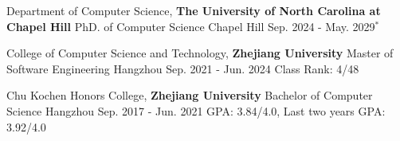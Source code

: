 \begin{cventries}

	\cventry
	{Department of Computer Science, \textbf{The University of North Carolina at Chapel Hill}} %
	{PhD. of Computer Science} %
	{Chapel Hill} %
	{Sep. 2024 - May. 2029$^*$} %
	{
	}%
	\vspace{-2mm}

	\cventry
	{College of Computer Science and Technology, \textbf{Zhejiang University}} %
	{Master of Software Engineering} %
	{Hangzhou} %
	{Sep. 2021 - Jun. 2024} %
	{
		Class Rank: 4/48
	}%

	\cventry
	{Chu Kochen Honors College, \textbf{Zhejiang University}} %
	{Bachelor of Computer Science} %
	{Hangzhou} %
	{Sep. 2017 - Jun. 2021} %
	{
		GPA: 3.84/4.0, Last two years GPA: 3.92/4.0
	}%

\end{cventries}
